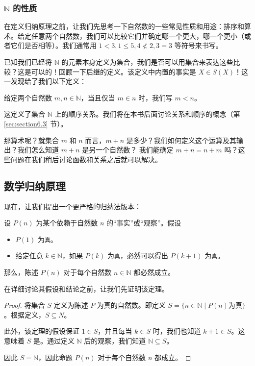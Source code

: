 \subsubsection*{$\mathbb{N}$ 的性质}

在定义归纳原理之前，让我们先思考一下自然数的一些常见性质和用途：排序和算术。给定任意两个自然数，我们可以比较它们并确定哪一个更大，哪一个更小（或者它们是否相等）。我们通常用 $1 < 3, 1 \le 5, 4 \nless 2, 3 = 3$ 等符号来书写。

已知我们已经将 $\mathbb{N}$ 的元素本身定义为集合，我们是否可以用集合来表达这些比较？这是可以的！回顾一下后继的定义。该定义中内置的事实是 $X \in S(X)$！这一发现给了我们以下定义：

\begin{definition}
    给定两个自然数 $m, n \in \mathbb{N}$，当且仅当 $m \in n$ 时，我们写 $m < n$。
\end{definition}

这定义了集合 $\mathbb{N}$ 上的顺序关系。我们将在本书后面讨论关系和顺序的概念（第 \ref{sec:section6.3} 节）。

那算术呢？就集合 $m$ 和 $n$ 而言，$m + n$ 是多少？我们如何定义这个运算及其输出？我们怎么知道 $m + n$ 是另一个自然数？ 我们能确定 $m + n = n + m$ 吗？这些问题在我们稍后讨论函数和关系之后就可以解决。

\subsection{数学归纳原理}\label{sec:section3.8.2}

现在，让我们提出一个更严格的归纳法版本：

\begin{theorem}[数学归纳原理]\label{theorem3.8}
    设 $P(n)$ 为某个依赖于自然数 $n$ 的``事实''或``观察''。假设
    \begin{itemize}
        \item $P(1)$ 为\verb|真|。
        \item 给定任意 $k \in \mathbb{N}$，如果 $P(k)$ 为\verb|真|，必然可以得出 $P(k+1)$ 为\verb|真|。
    \end{itemize}
    那么，陈述 $P(n)$ 对于每个自然数 $n \in \mathbb{N}$ 都必然成立。
\end{theorem}

在详细讨论其假设和结论之前，让我们先证明该定理。

\begin{proof}
    将集合 $S$ 定义为陈述 $P$ 为真的自然数。即定义 $S = \{n \in \mathbb{N} \mid P(n) \text{为真}\}$。根据定义，$S \subseteq N$。

    此外，该定理的假设保证 $1 \in S$，并且每当 $k \in S$ 时，我们也知道 $k + 1 \in S$。这意味着 $S$ 是。通过定义 $\mathbb{N}$ 后的观察，我们知道 $\mathbb{N} \subseteq S$。

    因此 $S = \mathbb{N}$，因此命题 $P(n)$ 对于每个自然数 $n$ 都成立。
\end{proof}

